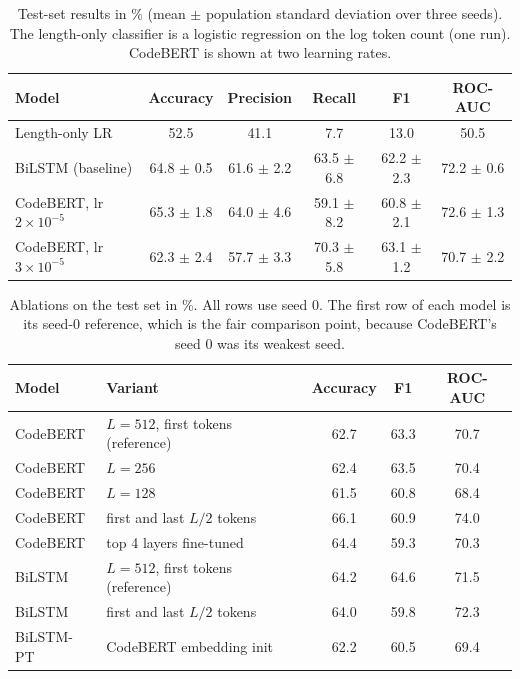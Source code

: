\documentclass{article}
\begin{document}
\begin{table}[h!]
  \caption{Test-set results in \% (mean $\pm$ population standard deviation over three seeds). The length-only classifier is a logistic regression on the log token count (one run). CodeBERT is shown at two learning rates.}
  \label{tab:main}
  \centering
  \small
  \begin{tabular}{lccccc}
    \toprule
    Model & Accuracy & Precision & Recall & F1 & ROC-AUC \\
    \midrule
    Length-only LR & 52.5 & 41.1 & 7.7 & 13.0 & 50.5 \\
    BiLSTM (baseline) & 64.8 $\pm$ 0.5 & 61.6 $\pm$ 2.2 & 63.5 $\pm$ 6.8 & 62.2 $\pm$ 2.3 & 72.2 $\pm$ 0.6 \\
    CodeBERT, lr $2\times10^{-5}$ & 65.3 $\pm$ 1.8 & 64.0 $\pm$ 4.6 & 59.1 $\pm$ 8.2 & 60.8 $\pm$ 2.1 & 72.6 $\pm$ 1.3 \\
    CodeBERT, lr $3\times10^{-5}$ & 62.3 $\pm$ 2.4 & 57.7 $\pm$ 3.3 & 70.3 $\pm$ 5.8 & 63.1 $\pm$ 1.2 & 70.7 $\pm$ 2.2 \\
    \bottomrule
  \end{tabular}
\end{table}

\begin{table}[h!]
  \caption{Ablations on the test set in \%. All rows use seed 0. The first row of each model is its seed-0 reference, which is the fair comparison point, because CodeBERT's seed 0 was its weakest seed.}
  \label{tab:abl}
  \centering
  \small
  \begin{tabular}{llccc}
    \toprule
    Model & Variant & Accuracy & F1 & ROC-AUC \\
    \midrule
    CodeBERT & $L=512$, first tokens (reference) & 62.7 & 63.3 & 70.7 \\
    CodeBERT & $L=256$ & 62.4 & 63.5 & 70.4 \\
    CodeBERT & $L=128$ & 61.5 & 60.8 & 68.4 \\
    CodeBERT & first and last $L/2$ tokens & 66.1 & 60.9 & 74.0 \\
    CodeBERT & top 4 layers fine-tuned & 64.4 & 59.3 & 70.3 \\
    \midrule
    BiLSTM & $L=512$, first tokens (reference) & 64.2 & 64.6 & 71.5 \\
    BiLSTM & first and last $L/2$ tokens & 64.0 & 59.8 & 72.3 \\
    BiLSTM-PT & CodeBERT embedding init & 62.2 & 60.5 & 69.4 \\
    \bottomrule
  \end{tabular}
\end{table}
\end{document}
